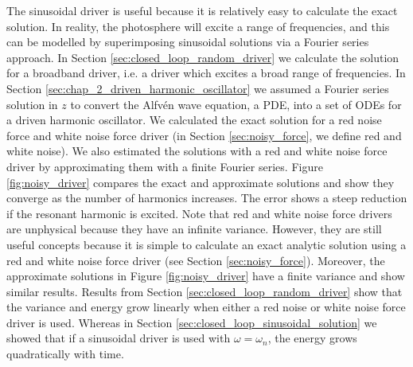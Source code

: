 The sinusoidal driver is useful because it is relatively easy to calculate the exact solution. In reality, the photosphere will excite a range of frequencies, and this can be modelled by superimposing sinusoidal solutions via a Fourier series approach. In Section \ref{sec:closed_loop_random_driver} we calculate the solution for a broadband driver, i.e. a driver which excites a broad range of frequencies. In Section \ref{sec:chap_2_driven_harmonic_oscillator} we assumed a Fourier series solution in $z$ to convert the Alfv\'en wave equation, a PDE, into a set of ODEs for a driven harmonic oscillator. We calculated the exact solution for a red noise force and white noise force driver (in Section \ref{sec:noisy_force}, we define red and white noise). We also estimated the solutions with a red and white noise force driver by approximating them with a finite Fourier series. Figure \ref{fig:noisy_driver} compares the exact and approximate solutions and show they converge as the number of harmonics increases. The error shows a steep reduction if the resonant harmonic is excited. Note that red and white noise force drivers are unphysical because they have an infinite variance. However, they are still useful concepts because it is simple to calculate an exact analytic solution using a red and white noise force driver (see Section \ref{sec:noisy_force}). Moreover, the approximate solutions in Figure \ref{fig:noisy_driver} have a finite variance and show similar results. Results from Section \ref{sec:closed_loop_random_driver} show that the variance and energy grow linearly when either a red noise or white noise force driver is used. Whereas in Section \ref{sec:closed_loop_sinusoidal_solution} we showed that if a sinusoidal driver is used with $\omega=\omega_n$, the energy grows quadratically with time.

